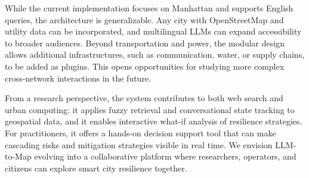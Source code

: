 \documentclass[sigconf,review,nonacm]{acmart}
\begin{document}
While the current implementation focuses on Manhattan and supports English queries, the architecture is generalizable. Any city with OpenStreetMap and utility data can be incorporated, and multilingual LLMs can expand accessibility to broader audiences. Beyond transportation and power, the modular design allows additional infrastructures, such as communication, water, or supply chains, to be added as plugins. This opens opportunities for studying more complex cross-network interactions in the future.

From a research perspective, the system contributes to both web search and urban computing: it applies fuzzy retrieval and conversational state tracking to geospatial data, and it enables interactive what-if analysis of resilience strategies. For practitioners, it offers a hands-on decision support tool that can make cascading risks and mitigation strategies visible in real time. We envision LLM-to-Map evolving into a collaborative platform where researchers, operators, and citizens can explore smart city resilience together.



\end{document}
